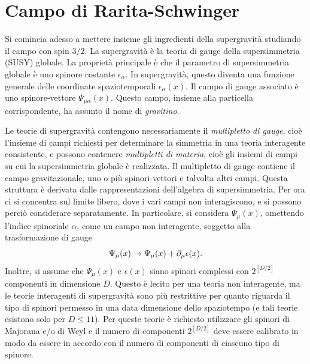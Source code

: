 \chapter{Campo di Rarita-Schwinger}
Si comincia adesso a mettere insieme gli ingredienti della supergravità studiando il campo con spin $3/2$. La supergravità è la teoria di gauge della supersimmetria (SUSY) globale. La proprietà principale è che il parametro di supersimmetria globale è uno spinore costante $\epsilon_\alpha$. In supergravità, questo diventa una funzione generale delle coordinate spaziotemporali $\epsilon_\alpha(x)$. Il campo di gauge associato è uno spinore-vettore $\Psi_{\mu\alpha}(x)$. Questo campo, insieme alla particella corrispondente, ha assunto il nome di \emph{gravitino}. 

Le teorie di supergravità contengono necessariamente il \emph{multipletto di gauge}, cioè l'insieme di campi richiesti per determinare la simmetria in una teoria interagente consistente, e possono contenere \emph{multipletti di materia}, cioè gli insiemi di campi su cui la supersimmetria globale è realizzata. Il multipletto di gauge contiene il campo gravitazionale, uno o più spinori-vettori e talvolta altri campi. Questa struttura è derivata dalle rappresentazioni dell'algebra di supersimmetria. Per ora ci si concentra sul limite libero, dove i vari campi non interagiscono, e si possono perciò considerare separatamente. In particolare, si considera $\Psi_\mu(x)$, omettendo l'indice spinoriale $\alpha$, come un campo non interagente, soggetto alla trasformazione di gauge 
\begin{equation}
\label{eq: trasformazione di gauge campo R-S}
    \Psi_\mu(x) \to \Psi_\mu(x) + \partial_\mu\epsilon(x).
\end{equation}
Inoltre, si assume che $\Psi_\mu(x)$ e $\epsilon(x)$ siano spinori complessi con $2^{[D/2]}$ componenti in dimensione $D$. Questo è lecito per una teoria non interagente, ma le teorie interagenti di supergravità sono più restrittive per quanto riguarda il tipo di spinori permesso in una data dimensione dello spaziotempo (e tali teorie esistono solo per $D \le 11$). Per queste teorie è richiesto utilizzare gli spinori di Majorana e/o di Weyl e il numero di componenti $2^{[D/2]}$ deve essere calibrato in modo da essere in accordo con il numero di componenti di ciascuno tipo di spinore. 

